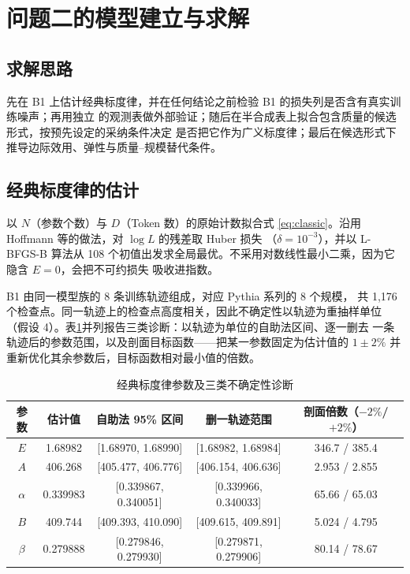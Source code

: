 \section{问题二的模型建立与求解}

\subsection{求解思路}

先在 B1 上估计经典标度律，并在任何结论之前检验 B1 的损失列是否含有真实训练噪声；再用独立
的观测表做外部验证；随后在半合成表上拟合包含质量的候选形式，按预先设定的采纳条件决定
是否把它作为广义标度律；最后在候选形式下推导边际效用、弹性与质量–规模替代条件。

\subsection{经典标度律的估计}

以 $N$（参数个数）与 $D$（Token 数）的原始计数拟合式 \eqref{eq:classic}。沿用
Hoffmann 等\cite{hoffmann2022chinchilla}的做法，对 $\log L$ 的残差取 Huber 损失\cite{huber1964robust}
（$\delta=10^{-3}$），并以 L-BFGS-B 算法\cite{byrd1995lbfgsb}从 108 个初值出发求全局最优。不采用对数线性最小二乘，因为它隐含 $E=0$，会把不可约损失
吸收进指数。

B1 由同一模型族的 8 条训练轨迹组成，对应 Pythia 系列的 8 个规模\cite{biderman2023pythia}，
共 1,176 个检查点。同一轨迹上的检查点高度相关，因此不确定性以轨迹为重抽样单位
（假设 4）。表\ref{tab:q2-params}并列报告三类诊断：以轨迹为单位的自助法区间、逐一删去
一条轨迹后的参数范围，以及剖面目标函数——把某一参数固定为估计值的
$1\pm2\%$ 并重新优化其余参数后，目标函数相对最小值的倍数。

\begin{table}[htbp]
  \centering
  \caption{经典标度律参数及三类不确定性诊断}
  \label{tab:q2-params}
  \begin{tabular}{ccccc}
    \toprule
    参数 & 估计值 & 自助法 95\% 区间 & 删一轨迹范围 & 剖面倍数（$-2\%$/$+2\%$） \\
    \midrule
    $E$ & 1.68982 & [1.68970, 1.68990] & [1.68982, 1.68984] & 346.7 / 385.4 \\
    $A$ & 406.268 & [405.477, 406.776] & [406.154, 406.636] & 2.953 / 2.855 \\
    $\alpha$ & 0.339983 & [0.339867, 0.340051] & [0.339966, 0.340033] & 65.66 / 65.03 \\
    $B$ & 409.744 & [409.393, 410.090] & [409.615, 409.891] & 5.024 / 4.795 \\
    $\beta$ & 0.279888 & [0.279846, 0.279930] & [0.279871, 0.279906] & 80.14 / 78.67 \\
    \bottomrule
  \end{tabular}
\end{table}

